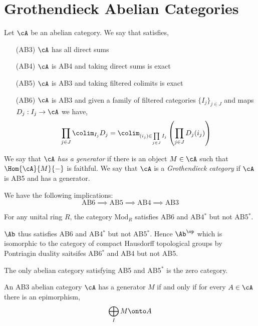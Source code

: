 \documentclass[12pt]{article}
\begin{document}
\section{Grothendieck Abelian Categories}

\begin{defn}
Let $\cA$ be an abelian category. We say that satisfies,
\begin{enumerate}
\item[(AB3)] $\cA$ has all direct sums
\item[(AB4)] $\cA$ is AB4 and taking direct sums is exact
\item[(AB5)] $\cA$ is AB3 and taking filtered colimits is exact
\item[(AB6)] $\cA$ is AB3 and given a family of filtered categories $\{ I_j \}_{j \in J}$ and maps $D_j : I_j \to \cA$ we have,
\[ \prod_{j \in J} \colim_{I_j} D_j = \colim_{(i_j) \in \prod\limits_{j \in J} I_j} \left( \prod_{j \in J} D_j(i_j) \right) \]
\end{enumerate}
We say that $\cA$ \textit{has a generator} if there is an object $M \in \cA$ such that $\Hom{\cA}{M}{-}$ is faithful. We say that $\cA$ is a \textit{Grothendieck category} if $\cA$ is AB5 and has a generator.
\end{defn}

\begin{lemma}
We have the following implications:
\[ \text{AB6} \implies \text{AB5} \implies \text{AB4} \implies \text{AB3} \]
\end{lemma}

\begin{lemma}
For any unital ring $R$, the category $\mathrm{Mod}_R$ satisfies AB6 and AB4$^*$ but not AB5$^*$.
\end{lemma}

\begin{example}
$\Ab$ thus satisfies AB6 and AB4$^*$ but not AB5$^*$. Hence $\Ab^\op$ which is isomorphic to the category of compact Hausdorff topological groups by Pontriagin duality saitsifes AB6$^*$ and AB4 but not AB5. 
\end{example}

\begin{lemma}
The only abelian category satisfying AB5 and AB5$^*$ is the zero category. 
\end{lemma}

\begin{lemma}
An AB3 abelian category $\cA$ has a generator $M$ if and only if for every $A \in \cA$ there is an epimorphism,
\[ \bigoplus_I M \onto A \]
\end{lemma}
\end{document}
